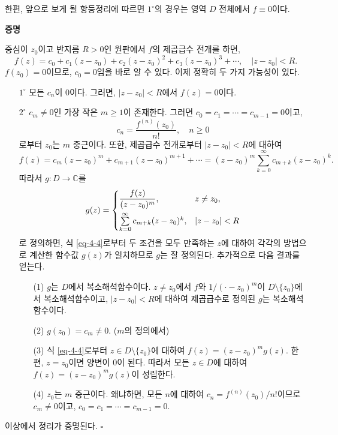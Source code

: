 한편, 앞으로 보게 될 항등정리에 따르면
$1^\circ$의 경우는 영역 $D$ 전체에서 $f\equiv 0$이다.

{\bf 증명}

중심이 $z_0$이고 반지름 $R>0$인 원판에서 $f$의 제곱급수 전개를 하면,
\[
f(z) = c_0 + c_1(z-z_0) + c_2(z-z_0)^2 + c_3(z-z_0)^3 + \cdots, \quad
|z-z_0| <R.
\]
$f(z_0)=0$이므로, $c_0=0$임을 바로 알 수 있다. 
이제 정확히 두 가지 가능성이 있다.
\begin{itemize}
\item[$1^\circ$] 모든 $c_n$이 $0$이다. 그러면, $|z-z_0| <R$에서 $f(z)=0$이다.
\item[$2^\circ$] $c_m\ne 0$인 가장 작은 $m\ge1$이 존재한다.
그러면 $c_0=c_1=\cdots = c_{m-1}=0$이고,
\[
c_n = \dfrac{f^{(n)}(z_0)}{n!}, \quad n\ge0
\]
로부터 $z_0$는 $m$ 중근이다.
또한, 제곱급수 전개로부터 $|z-z_0|<R$에 대하여
\begin{equation} \label{eq-4-4}
f(z) = c_m(z-z_0)^m + c_{m+1}(z-z_0)^{m+1} + \cdots
= (z-z_0)^m \sum_{k=0}^\infty c_{m+k} (z-z_0)^k.
\end{equation}
따라서 $g:D\to \mathbb C$를 
\[
g(z) = \begin{cases}
\displaystyle\frac{f(z)}{(z-z_0)^m}, & z\ne z_0, \\[2ex]
\sum\limits_{k=0}^\infty c_{m+k} (z-z_0)^k, & |z-z_0|<R
\end{cases}	
\]
로 정의하면,
식 \eqref{eq-4-4}로부터 두 조건을 모두 만족하는 $z$에 대하여
각각의 방법으로 계산한 함수값 $g(z)$가 일치하므로
$g$는 잘 정의된다. 추가적으로 다음 결과를 얻는다.
\begin{itemize}
\item[(1)]  $g$는 $D$에서 복소해석함수이다. $z\ne z_0$에서
$f$와 $1/(\cdot - z_0)^m$이 $D\setminus \{z_0\}$에서 복소해석함수이고,
$|z-z_0|<R$에 대하여 제곱급수로 정의된 $g$는 복소해석함수이다.
\item[(2)] $g(z_0) = c_m\ne 0$. ($m$의 정의에서)
\item[(3)] 식 \eqref{eq-4-4}로부터 $z\in D\setminus \{z_0\}$에 대하여
$f(z) = (z-z_0)^mg(z)$. 한편, $z=z_0$이면 양변이 $0$이 된다.
따라서 모든 $z\in D$에 대하여 $f(z) = (z-z_0)^mg(z)$이 성립한다.
\item[(4)] $z_0$는 $m$ 중근이다.
왜냐하면, 모든 $n$에 대하여 $c_n = f^{(n)}(z_0)/n!$이므로
$c_m \ne 0$이고, $c_0 = c_1 = \cdots = c_{m-1}= 0$.
\end{itemize}
\end{itemize}
이상에서 정리가 증명된다. \hfill $\square$

